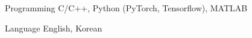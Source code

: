 
\begin{cvskills}

  \cvskill
  {Programming}
  {C/C++, Python (PyTorch, Tensorflow), MATLAB}


  \cvskill
    {Language} %
    {English, Korean} %

\end{cvskills}
